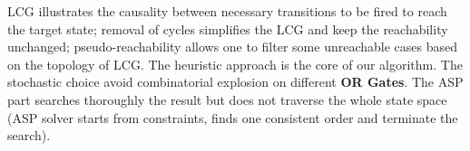 \documentclass{entcs}
\begin{document}
LCG illustrates the causality between necessary transitions to be fired to reach the target state; 
removal of cycles simplifies the LCG and keep the reachability unchanged; 
pseudo-reachability allows one to filter some unreachable cases based on the topology of LCG. 
The heuristic approach is the core of our algorithm.
The stochastic choice avoid combinatorial explosion on different \textbf{OR Gates}.
The ASP part searches thoroughly the result but does not traverse the whole state space (ASP solver starts from constraints, finds one consistent order and terminate the search). 
\end{document}
